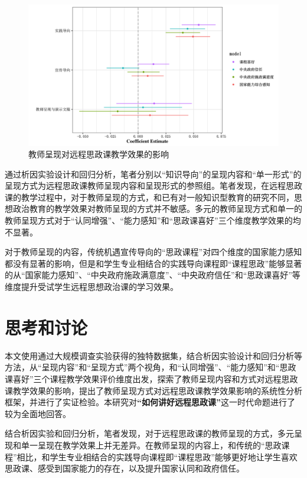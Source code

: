 \documentclass[
  12pt,
]{ctexart}
\begin{document}
\begin{figure}[h]
\includegraphics[width=1\linewidth]{../figures/figure4} \caption{教师呈现对远程思政课教学效果的影响}\label{fig:unnamed-chunk-7}
\end{figure}

通过析因实验设计和回归分析，笔者分别以``知识导向''的呈现内容和``单一形式''的呈现方式为远程思政课教师呈现内容和呈现形式的参照组。笔者发现，在远程思政课的教学过程中，对于教师呈现的方式，和已有对一般知识型教育的研究不同，思想政治教育的教学效果对教师呈现的方式并不敏感。多元的教师呈现方式和单一的教师呈现方式对于``认同增强''、``能力感知''和``思政课喜好''三个维度教学效果的均不显著。

对于教师呈现的内容，传统机遇宣传导向的``思政课程''对四个维度的国家能力感知都没有显著的影响，但是和学生专业相结合的实践导向课程即``课程思政''能够显著的从``国家能力感知''、``中央政府施政满意度''、``中央政府信任''和``思政课喜好''等维度提升受试学生远程思想政治课的学习效果。

\hypertarget{ux601dux8003ux548cux8ba8ux8bba}{%
\section{思考和讨论}\label{ux601dux8003ux548cux8ba8ux8bba}}

本文使用通过大规模调查实验获得的独特数据集，结合析因实验设计和回归分析等方法，从``呈现内容''和``呈现方式''两个视角，和``认同增强''、``能力感知''和``思政课喜好''三个课程教学效果评价维度出发，探索了教师呈现内容和方式对远程思政课教学效果的影响，提出了教师呈现方式对远程思政课教学效果影响的系统性分析框架，并进行了实证检验。本研究对\textbf{``如何讲好远程思政课''}这一时代命题进行了较为全面地回答。

结合析因实验和回归分析，笔者发现，对于远程思政课的教师呈现的方式，多元呈现和单一呈现在教学效果上并无差异。在教师呈现的内容上，和传统的``思政课程''相比，和学生专业相结合的实践导向课程即``课程思政''能够更好地让学生喜欢思政课、感受到国家能力的存在，以及提升国家认同和政府信任。
\end{document}
